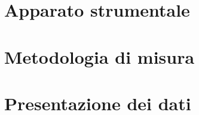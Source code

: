 \documentclass[11pt,a4paper]{article} %
\begin{document}


{

\maketitle %

\begin{center}
\end{center}

\begin{abstract}
	\noindent
	
\end{abstract}

\newpage


\tableofcontents %


\section{Apparato strumentale}
	

\section{Metodologia di misura}
	

\section{Presentazione dei dati}
	

}
\end{document}
